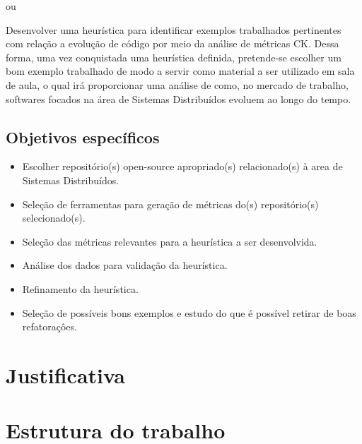 ou

Desenvolver uma heurística para identificar exemplos trabalhados pertinentes com relação a evolução de código por meio da análise de métricas CK. Dessa forma, uma vez conquistada uma heurística definida, pretende-se escolher um bom exemplo trabalhado de modo a servir como material a ser utilizado em sala de aula, o qual irá proporcionar uma análise de como, no mercado de trabalho, softwares focados na área de Sistemas Distribuídos evoluem ao longo do tempo.

\subsection{Objetivos específicos}\label{subsec:objetivosEspecificos}

\begin{itemize}
    \item Escolher repositório(s) open-source apropriado(s) relacionado(s) à area de Sistemas Distribuídos.
    \item Seleção de ferramentas para geração de métricas do(s) repositório(s) selecionado(s).
    \item Seleção das métricas relevantes para a heurística a ser desenvolvida.
    \item Análise dos dados para validação da heurística.
    \item Refinamento da heurística.
    \item Seleção de possíveis bons exemplos e estudo do que é possível retirar de boas refatoraçôes.
\end{itemize}

\section{Justificativa}\label{sec:justificativa}

\section{Estrutura do trabalho}\label{sec:estruturaTrabalho}
